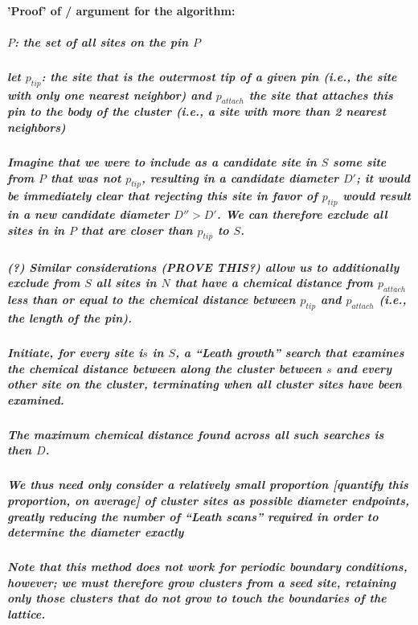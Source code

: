\documentclass[pre,preprint]{revtex4-1}
\begin{document}
\paragraph{'Proof' of / argument for the algorithm:}
\label{sec-1.2.4.5}
\subparagraph{$P$: the set of all sites on the pin $P$}
\label{sec-1.2.4.5.1}
\subparagraph{let $p_{tip}$: the site that is the outermost tip of a given pin (i.e., the site with only one nearest neighbor) and $p_{attach}$ the site that attaches this pin to the body of the cluster (i.e., a site with more than 2 nearest neighbors)}
\label{sec-1.2.4.5.2}
\subparagraph{Imagine that we were to include as a candidate site in $S$ some site from $P$ that was not $p_{tip}$, resulting in a candidate diameter $D'$; it would be immediately clear that rejecting this site in favor of $p_{tip}$ would result in a new candidate diameter $D''>D'$.  We can therefore exclude all sites in in $P$ that are closer than $p_{tip}$ to $S$.}
\label{sec-1.2.4.5.3}
\subparagraph{(?) Similar considerations (PROVE THIS?) allow us to additionally exclude from $S$ all sites in $N$ that have a chemical distance from $p_{attach}$ less than or equal to the chemical distance between $p_{tip}$ and $p_{attach}$ (i.e., the length of the pin).}
\label{sec-1.2.4.5.4}
\subparagraph{Initiate, for every site i$s$ in $S$, a ``Leath growth'' search that examines the chemical distance between along the cluster between $s$ and every other site on the cluster, terminating when all cluster sites have been examined.}
\label{sec-1.2.4.5.5}
\subparagraph{The maximum chemical distance found across all such searches is then $D$.}
\label{sec-1.2.4.5.6}
\subparagraph{We thus need only consider a relatively small proportion [quantify this proportion, on average] of cluster sites as possible diameter endpoints, greatly reducing the number of ``Leath scans'' required in order to determine the diameter exactly}
\label{sec-1.2.4.5.7}
\subparagraph{Note that this method does not work for periodic boundary conditions, however; we must therefore grow clusters from a seed site, retaining only those clusters that do not grow to touch the boundaries of the lattice.}
\label{sec-1.2.4.5.8}
\end{document}
